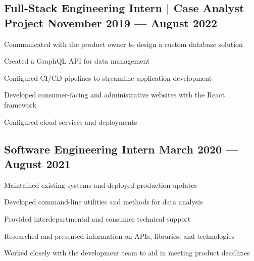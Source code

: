 \subsection{{Full-Stack Engineering Intern | Case Analyst Project \hfill November 2019 --- August 2022}}
\begin{zitemize}
\item Communicated with the product owner to design a custom database solution
\item Created a GraphQL API for data management
\item Configured CI/CD pipelines to streamline application development
\item Developed consumer-facing and administrative websites with the React framework
\item Configured cloud services and deployments
\end{zitemize}

\subsection{{Software Engineering Intern \hfill March 2020 --- August 2021}}
\begin{zitemize}
\item Maintained existing systems and deployed production updates
\item Developed command-line utilities and methods for data analysis
\item Provided interdepartmental and consumer technical support
\item Researched and presented information on APIs, libraries, and technologies
\item Worked closely with the development team to aid in meeting product deadlines
\end{zitemize}
